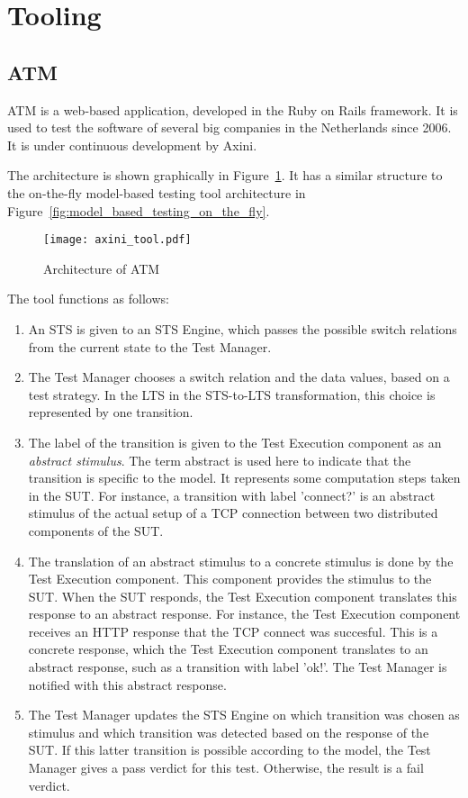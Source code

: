 \section{Tooling}\label{sec:tooling}

\subsection{ATM}\label{sec:descriptionaxini}
ATM is a web-based application, developed in the Ruby on Rails framework. It is used to test the software of several big companies in the Netherlands since 2006. It is under continuous development by Axini.

The architecture is shown graphically in Figure~\ref{fig:axini_tool}. It has a similar structure to the on-the-fly model-based testing tool architecture in Figure~\ref{fig:model_based_testing_on_the_fly}.

\begin{figure}[h!]
  \begin{center}
    \texttt{[image: axini\_tool.pdf]}
  \end{center}
  \caption{Architecture of ATM}
  \label{fig:axini_tool}
\end{figure}

The tool functions as follows: 
\begin{enumerate}
  \item An STS is given to an STS Engine, which passes the possible switch relations from the current state to the Test Manager.
  \item The Test Manager chooses a switch relation and the data values, based on a test strategy. In the LTS in the STS-to-LTS transformation, this choice is represented by one transition. 
  \item The label of the transition is given to the Test Execution component as an \textit{abstract stimulus}. The term abstract is used here to indicate that the transition is specific to the model. It represents some computation steps taken in the SUT. For instance, a transition with label 'connect?' is an abstract stimulus of the actual setup of a TCP connection between two distributed components of the SUT. 
  \item The translation of an abstract stimulus to a concrete stimulus is done by the Test Execution component. This component provides the stimulus to the SUT. When the SUT responds, the Test Execution component translates this response to an abstract response. For instance, the Test Execution component receives an HTTP response that the TCP connect was succesful. This is a concrete response, which the Test Execution component translates to an abstract response, such as a transition with label 'ok!'. The Test Manager is notified with this abstract response.
  \item The Test Manager updates the STS Engine on which transition was chosen as stimulus and which transition was detected based on the response of the SUT. If this latter transition is possible according to the model, the Test Manager gives a pass verdict for this test. Otherwise, the result is a fail verdict.
\end{enumerate}

